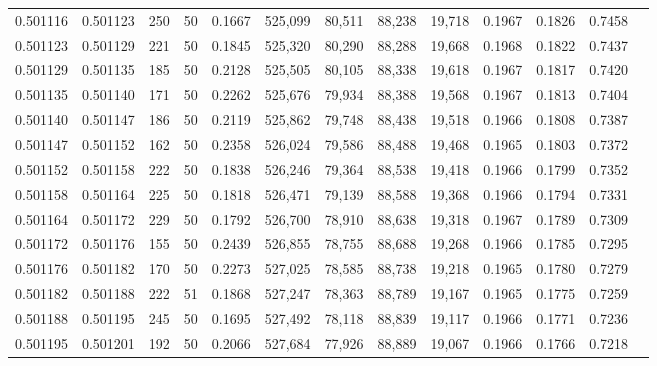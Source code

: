 \begin{tabular}{rrrrrrrrrrrrr}
0.501116 & 0.501123 & 250 &  50 &                                     0.1667 & 525,099 &  80,511 &  88,238 &  19,718 & 0.1967 & 0.1826 & 0.7458 \\
0.501123 & 0.501129 & 221 &  50 &                                     0.1845 & 525,320 &  80,290 &  88,288 &  19,668 & 0.1968 & 0.1822 & 0.7437 \\
0.501129 & 0.501135 & 185 &  50 &                                     0.2128 & 525,505 &  80,105 &  88,338 &  19,618 & 0.1967 & 0.1817 & 0.7420 \\
0.501135 & 0.501140 & 171 &  50 &                                     0.2262 & 525,676 &  79,934 &  88,388 &  19,568 & 0.1967 & 0.1813 & 0.7404 \\
0.501140 & 0.501147 & 186 &  50 &                                     0.2119 & 525,862 &  79,748 &  88,438 &  19,518 & 0.1966 & 0.1808 & 0.7387 \\
0.501147 & 0.501152 & 162 &  50 &                                     0.2358 & 526,024 &  79,586 &  88,488 &  19,468 & 0.1965 & 0.1803 & 0.7372 \\
0.501152 & 0.501158 & 222 &  50 &                                     0.1838 & 526,246 &  79,364 &  88,538 &  19,418 & 0.1966 & 0.1799 & 0.7352 \\
0.501158 & 0.501164 & 225 &  50 &                                     0.1818 & 526,471 &  79,139 &  88,588 &  19,368 & 0.1966 & 0.1794 & 0.7331 \\
0.501164 & 0.501172 & 229 &  50 &                                     0.1792 & 526,700 &  78,910 &  88,638 &  19,318 & 0.1967 & 0.1789 & 0.7309 \\
0.501172 & 0.501176 & 155 &  50 &                                     0.2439 & 526,855 &  78,755 &  88,688 &  19,268 & 0.1966 & 0.1785 & 0.7295 \\
0.501176 & 0.501182 & 170 &  50 &                                     0.2273 & 527,025 &  78,585 &  88,738 &  19,218 & 0.1965 & 0.1780 & 0.7279 \\
0.501182 & 0.501188 & 222 &  51 &                                     0.1868 & 527,247 &  78,363 &  88,789 &  19,167 & 0.1965 & 0.1775 & 0.7259 \\
0.501188 & 0.501195 & 245 &  50 &                                     0.1695 & 527,492 &  78,118 &  88,839 &  19,117 & 0.1966 & 0.1771 & 0.7236 \\
0.501195 & 0.501201 & 192 &  50 &                                     0.2066 & 527,684 &  77,926 &  88,889 &  19,067 & 0.1966 & 0.1766 & 0.7218 \\

\end{tabular}
